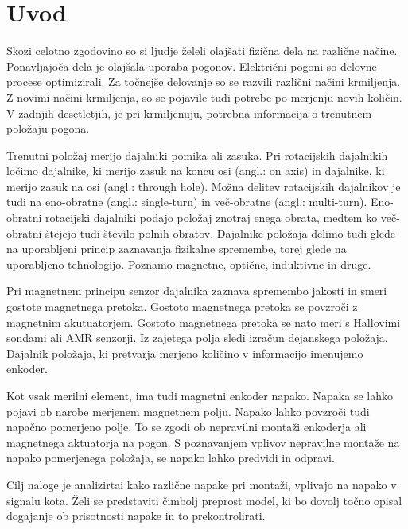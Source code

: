﻿\chapter{Uvod} \label{uvod}
Skozi celotno zgodovino so si ljudje želeli olajšati fizična dela na različne načine. Ponavljajoča dela je olajšala uporaba pogonov. Električni pogoni so delovne procese optimizirali.
Za točnejše delovanje so se razvili različni načini krmiljenja. Z novimi načini krmiljenja, so se pojavile tudi potrebe po merjenju novih količin. V zadnjih desetletjih, je pri krmiljenuju, potrebna informacija
o trenutnem položaju pogona.

Trenutni položaj merijo dajalniki pomika ali zasuka\cite{uporabaSenzorjev}. Pri rotacijskih dajalnikih ločimo dajalnike, ki merijo zasuk na koncu osi (angl.: on axis) in dajalnike, ki merijo zasuk na osi (angl.: through hole).
Možna delitev rotacijskih dajalnikov je tudi na eno-obratne (angl.: single-turn) in več-obratne (angl.: multi-turn). Eno-obratni rotacijski dajalniki podajo položaj znotraj enega obrata, medtem ko več-obratni
štejejo tudi število polnih obratov. Dajalnike položaja delimo tudi glede na uporabljeni princip zaznavanja fizikalne
spremembe, torej glede na uporabljeno tehnologijo. Poznamo magnetne, optične,
induktivne in druge\cite{killer}.

Pri magnetnem principu senzor dajalnika zaznava spremembo jakosti in smeri
gostote magnetnega pretoka. 
Gostoto magnetnega pretoka se povzroči z magnetnim akutuatorjem. Gostoto magnetnega pretoka se nato meri s Hallovimi sondami ali AMR senzorji.
Iz zajetega polja sledi izračun dejanskega položaja. Dajalnik položaja, ki pretvarja merjeno količino v informacijo imenujemo enkoder\cite{enkoder}.

Kot vsak merilni element, ima tudi magnetni enkoder napako. Napaka se lahko pojavi ob narobe merjenem magnetnem polju\cite{RLS3}. Napako lahko povzroči tudi napačno pomerjeno polje.
To se zgodi ob nepravilni montaži enkoderja ali magnetnega aktuatorja na pogon. S poznavanjem vplivov nepravilne montaže na napako pomerjenega položaja, se napako lahko predvidi in odpravi.

Cilj naloge je analizirtai kako različne napake pri montaži, vplivajo na napako v signalu kota.
Želi se predstaviti čimbolj preprost model, ki bo dovolj točno opisal dogajanje ob prisotnosti napake in to prekontrolirati.

